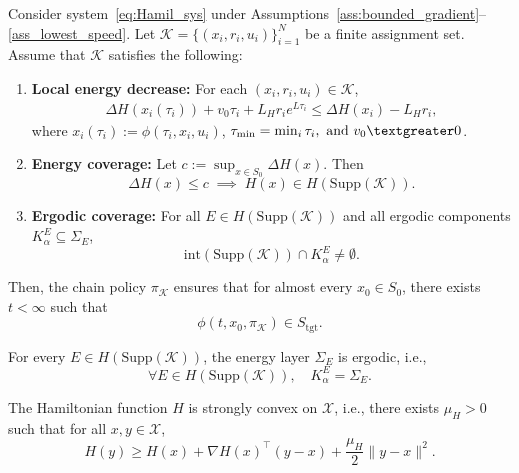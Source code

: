 \documentclass[10pt,a4paper]{amsart}
\newcommand{\Supp}{\mathrm{Supp}}
\newcommand{\tgt}{\mathrm{tgt}}
\begin{document}
\begin{theorem}
\label{thm_general_reachability}
Consider system~\eqref{eq:Hamil_sys} under Assumptions~\ref{ass:bounded_gradient}--\ref{ass_lowest_speed}. 
Let $\mathcal{K} = \{(x_i, r_i, u_i)\}_{i=1}^N$ be a finite assignment set. 
Assume that $\mathcal{K}$ satisfies the following:

\begin{enumerate}
\item \textbf{Local energy decrease:}\label{condition1}
For each $(x_i,r_i,u_i)\in \mathcal{K}$,
\begin{align*}
\Delta H(x_i(\tau_i)) \!+\! v_0 \tau_i \!+\! L_H r_i e^{L \tau_i}
\!\le\! \Delta H(x_i) \!-\! L_H r_i,
\end{align*}
where $x_i(\tau_i):=\phi(\tau_i,x_i,u_i)$, $\tau_{\min}=\min_i\tau_i,\ \text{and }v_0 \textgreater 0$.
\item \textbf{Energy coverage:}\label{condition2}
Let $c := \sup_{x\in S_0} \Delta H(x)$. Then
\[
\Delta H(x)\le c \;\implies\; H(x)\in H(\Supp(\mathcal{K})).
\]
\item \textbf{Ergodic coverage:}\label{condition3}
For all $E \in H(\Supp(\mathcal{K}))$ and all ergodic components $K_\alpha^E \subseteq \Sigma_E$,
\[
\mathrm{int}(\Supp(\mathcal{K})) \cap K_\alpha^E \neq \emptyset.
\]
\end{enumerate}

Then, the chain policy $\pi_{\mathcal{K}}$ ensures that for almost every $x_0 \in S_0$, there exists $t<\infty$ such that
\[
\phi(t,x_0,\pi_{\mathcal{K}}) \in S_{\tgt}.
\]
\end{theorem}

\begin{assumption}
\label{ass_dim_ergodic_components}
For every $E \in H(\Supp(\mathcal{K}))$, the energy layer $\Sigma_E$ is ergodic, i.e.,
\[
\forall E \in H(\Supp(\mathcal{K})),\quad K_\alpha^E = \Sigma_E.
\]
\end{assumption}

\begin{assumption}
\label{ass_strong_convexity}
The Hamiltonian function $H$ is strongly convex on $\mathcal{X}$, i.e., there exists $\mu_H>0$ such that for all $x,y\in\mathcal{X}$,
\[
H(y)\ge H(x)+\nabla H(x)^\top (y-x)+\frac{\mu_H}{2}\|y-x\|^2.
\]
\end{assumption}
\end{document}

